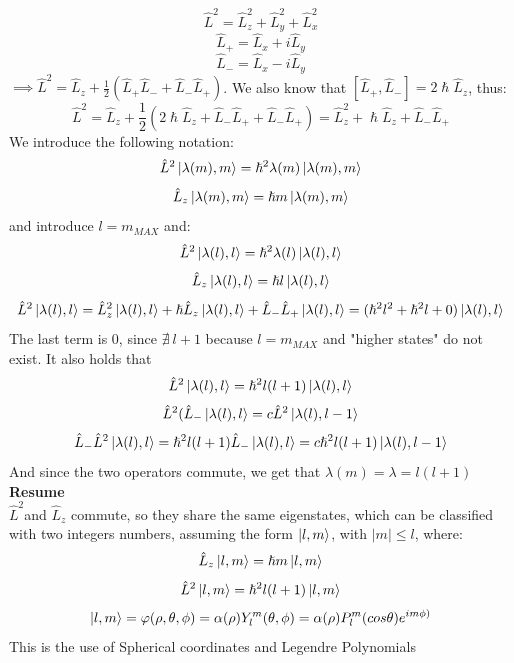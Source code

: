\documentclass{article}
\begin{document}
$$\hat{L}^2 = \hat{L}_z^2 + \hat{L}_y^2+ \hat{L}_x^2$$
$$\hat{L}_+ = \hat{L}_x + i \hat{L}_y$$
$$\hat{L}_- = \hat{L}_x - i \hat{L}_y$$
$\implies \hat{L}^2 = \hat{L}_z + \frac{1}{2} (\hat{L}_+ \hat{L}_- + \hat{L}_-\hat{L}_+)$. We also know that $[\hat{L}_+,\hat{L}_-] = 2 \hslash \hat{L}_z$, thus:
$$\hat{L}^2 = \hat{L}_z + \frac{1}{2} ( 2 \hslash\hat{L}_z + \hat{L}_-\hat{L}_+ + \hat{L}_-\hat{L}_+ ) = \hat{L}_z^2+ \hslash \hat{L}_z + \hat{L}_-\hat{L}_+$$
We introduce the following notation:
$$\hat{L}^2 \ket{\lambda(m),m} = \hslash^2 \lambda(m) \ket{\lambda(m),m}$$
$$\hat{L}_z \ket{\lambda(m),m} = \hslash m \ket{\lambda(m),m}$$
and introduce  $l = m_{MAX}$ and: 
$$\hat{L}^2 \ket{\lambda(l),l} = \hslash^2 \lambda(l) \ket{\lambda(l),l}$$
$$\hat{L}_z \ket{\lambda(l),l} = \hslash l \ket{\lambda(l),l}$$
$$\hat{L}^2 \ket{\lambda(l),l} = \hat{L}_z^2 \ket{\lambda(l),l}+ \hslash \hat{L}_z \ket{\lambda(l),l} + \hat{L}_-\hat{L}_+ \ket{\lambda(l),l} =( \hslash^2 l^2 + \hslash^2 l + 0) \ket{\lambda(l),l} $$
The last term is $0$, since $\nexists \ l+1$ because $l = m_{MAX}$ and "higher states" do not exist. It also holds that
$$\hat{L}^2 \ket{\lambda(l),l} = \hslash^2 l (l+1) \ket{\lambda(l),l}$$
$$\hat{L}^2(\hat{L}_- \ket{\lambda(l),l} = c \hat{L}^2 \ket{\lambda(l),l-1}$$
$$\hat{L}_- \hat{L}^2 \ket{\lambda(l),l} = \hslash^2 l (l+1) \hat{L}_- \ket{\lambda(l),l} = c \hslash^2 l(l+1)\ket{\lambda(l),l-1}$$
And since the two operators commute, we get that $\lambda(m)= \lambda = l(l+1)$ \\
\textbf{Resume} \\
$\hat{L}^2 $and $\hat{L}_z$ commute, so they share the same eigenstates, which can be classified with two integers numbers, assuming the form $\ket{l,m}$, with $|m| \leq l$, where:
$$\hat{L}_z \ket{l,m} = \hslash m \ket{l,m}$$
$$\hat{L}^2 \ket{l,m} = \hslash^2 l (l+1) \ket{l,m}$$
$$\ket{l,m} = \varphi(\rho,\theta,\phi) = \alpha(\rho) Y_l^m(\theta,\phi) = \alpha(\rho) P_l^m (cos\theta) e^{i m\phi)}$$
This is the use of Spherical coordinates and Legendre Polynomials
\end{document}
